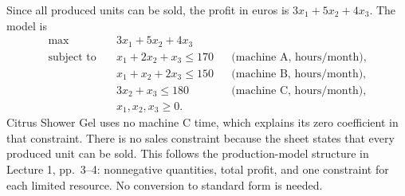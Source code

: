 \documentclass[11pt,a4paper]{article}
\begin{document}
Since all produced units can be sold, the profit in euros is $3x_1+5x_2+4x_3$. The model is
\begin{align*}
\max\quad &3x_1+5x_2+4x_3\\
\text{subject to}\quad
&x_1+2x_2+x_3\leq170 &&\text{(machine A, hours/month)},\\
&x_1+x_2+2x_3\leq150 &&\text{(machine B, hours/month)},\\
&3x_2+x_3\leq180 &&\text{(machine C, hours/month)},\\
&x_1,x_2,x_3\geq0.
\end{align*}
Citrus Shower Gel uses no machine C time, which explains its zero coefficient in that constraint. There is no sales constraint because the sheet states that every produced unit can be sold. This follows the production-model structure in Lecture 1, pp.~3--4: nonnegative quantities, total profit, and one constraint for each limited resource. No conversion to standard form is needed.
\end{document}

